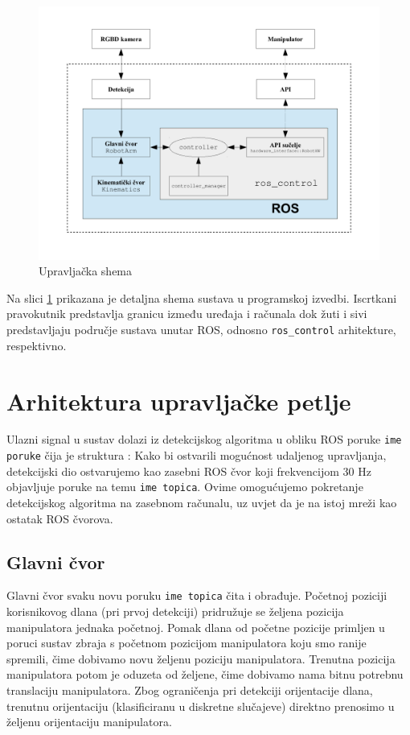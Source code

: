\documentclass[times, utf8, diplomski, numeric]{fer}
\begin{document}
\begin{figure}[h!]
\centering
\includegraphics[width=\textwidth]{upr_shema}
\caption{Upravljačka shema}\label{upr_shm}
\end{figure}

Na slici \ref{upr_shm} prikazana je detaljna shema sustava u programskoj izvedbi.
Iscrtkani pravokutnik predstavlja granicu između uređaja i računala dok žuti i sivi predstavljaju područje sustava unutar ROS, odnosno \verb|ros_control| arhitekture, respektivno.


\section{Arhitektura upravljačke petlje}
Ulazni signal u sustav dolazi iz detekcijskog algoritma u obliku ROS poruke \verb|ime poruke| čija je struktura :
Kako bi ostvarili mogućnost udaljenog upravljanja, detekcijski dio ostvarujemo kao zasebni ROS čvor koji frekvencijom 30 Hz objavljuje poruke na temu \verb|ime topica|.
Ovime omogućujemo pokretanje detekcijskog algoritma na zasebnom računalu, uz uvjet da je na istoj mreži kao ostatak ROS čvorova.

\subsection{Glavni čvor}
Glavni čvor svaku novu poruku \verb|ime topica| čita i obrađuje.
Početnoj poziciji korisnikovog dlana (pri prvoj detekciji) pridružuje se željena pozicija manipulatora jednaka početnoj.
Pomak dlana od početne pozicije primljen u poruci sustav zbraja s početnom pozicijom manipulatora koju smo ranije spremili, čime dobivamo novu željenu poziciju manipulatora.
Trenutna pozicija manipulatora potom je oduzeta od željene, čime dobivamo nama bitnu potrebnu translaciju manipulatora.
Zbog ograničenja pri detekciji orijentacije dlana, trenutnu orijentaciju (klasificiranu u diskretne slučajeve) direktno prenosimo u željenu orijentaciju manipulatora.
\end{document}
